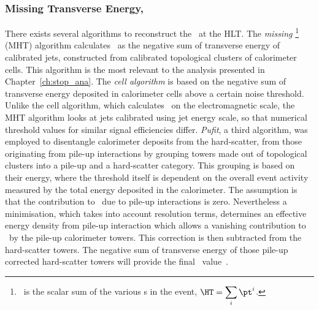 			\subsubsection*{Missing Transverse Energy, \met}

				There exists several algorithms to reconstruct the \met\ at the \ac{HLT}. The \textit{missing} \HT\footnote{\HT\ is the scalar sum of the various \pt s in the event, $\displaystyle \HT = \sum_{i} \pt^i$.} (MHT) algorithm calculates \met\ as the negative sum of transverse energy of calibrated jets, constructed from calibrated topological clusters of calorimeter cells. This algorithm is the most relevant to the analysis presented in Chapter~\ref{ch:stop_ana}. The \textit{cell algorithm} is based on the negative sum of transverse energy deposited in calorimeter cells above a certain noise threshold. Unlike the cell algorithm, which calculates \met\ on the electromagnetic scale, the MHT algorithm looks at jets calibrated using jet energy scale, so that numerical threshold values for similar signal efficiencies differ. \textit{Pufit}, a third algorithm, was employed to disentangle calorimeter deposits from the hard-scatter, from those originating from pile-up interactions by grouping towers made out of topological clusters into a pile-up and a hard-scatter category. This grouping is based on their energy, where the threshold itself is dependent on the overall event activity measured by the total energy deposited in the calorimeter. The assumption is that the contribution to \met\ due to pile-up interactions is zero. Nevertheless a minimisation, which takes into account resolution terms, determines an effective energy density from pile-up interaction which allows a vanishing contribution to \met\ by the pile-up calorimeter towers. This correction is then subtracted from the hard-scatter towers. The negative sum of transverse energy of those pile-up corrected hard-scatter towers will provide the final \met\ value~\cite{ATL-COM-DAQ-2016-137}.

